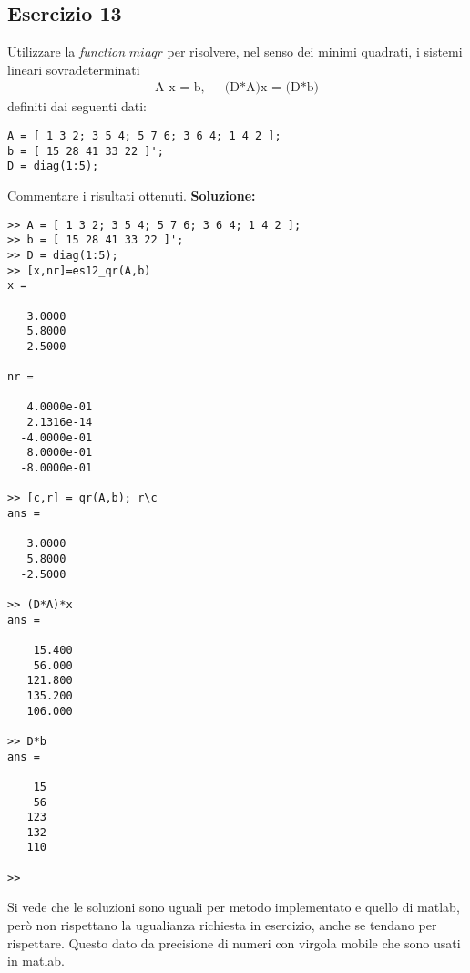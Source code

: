 \subsection{Esercizio 13}
Utilizzare la \textit{function} $miaqr$ per risolvere, nel senso dei minimi quadrati,
i sistemi lineari sovradeterminati
\begin{eqnarray*}
    \mbox{A x = b,} & & \mbox{(D*A)x = (D*b)}
\end{eqnarray*}
definiti dai seguenti dati:
\begin{lstlisting}
A = [ 1 3 2; 3 5 4; 5 7 6; 3 6 4; 1 4 2 ];
b = [ 15 28 41 33 22 ]';
D = diag(1:5);
\end{lstlisting}
Commentare i risultati ottenuti.
\newline \textbf{Soluzione:}
\begin{lstlisting}
>> A = [ 1 3 2; 3 5 4; 5 7 6; 3 6 4; 1 4 2 ];
>> b = [ 15 28 41 33 22 ]';
>> D = diag(1:5);
>> [x,nr]=es12_qr(A,b)
x =

   3.0000
   5.8000
  -2.5000

nr =

   4.0000e-01
   2.1316e-14
  -4.0000e-01
   8.0000e-01
  -8.0000e-01

>> [c,r] = qr(A,b); r\c
ans =

   3.0000
   5.8000
  -2.5000

>> (D*A)*x
ans =

    15.400
    56.000
   121.800
   135.200
   106.000

>> D*b
ans =

    15
    56
   123
   132
   110

>>
\end{lstlisting}
Si vede che le soluzioni sono uguali per metodo implementato e quello di matlab,
però non rispettano la ugualianza richiesta in esercizio, anche se tendano per rispettare.
Questo dato da precisione di numeri con virgola mobile che sono usati in matlab.
